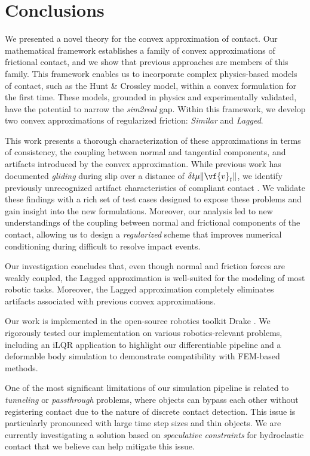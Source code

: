 \section{Conclusions}
\label{sec:conclusions}

We presented a novel theory for the convex approximation of contact. Our
mathematical framework establishes a family of convex approximations of
frictional contact, and we show that previous approaches
\cite{bib:anitescu2006,bib:todorov2011,bib:castro2022unconstrained} are members of
this family. This framework enables us to incorporate complex physics-based
models of contact, such as the Hunt \& Crossley \cite{bib:hunt_crossley} model,
within a convex formulation for the first time. These models, grounded
in physics and experimentally validated, have the potential to narrow the
\emph{sim2real} gap. Within this framework, we develop two convex approximations
of regularized friction: \emph{Similar} and \emph{Lagged}.

This work presents a thorough characterization of these approximations in
terms of consistency, the coupling between normal and tangential components, and
artifacts introduced by the convex approximation. While previous work has documented
\emph{gliding} during slip over a distance of $\delta t\mu\Vert\vf{v}_t\Vert$, we
identify previously unrecognized artifact characteristics of compliant contact
\cite{bib:todorov2011,bib:castro2022unconstrained}.
We validate these findings with a rich set of test cases designed to expose these
problems and gain insight into the new formulations. Moreover, our analysis
led to new understandings of the coupling between normal and frictional
components of the contact, allowing us to design a \emph{regularized} scheme that improves
numerical conditioning during difficult to resolve impact events. 

Our investigation concludes that, even though normal and friction forces are
weakly coupled, the Lagged approximation is well-suited for the modeling of most
robotic tasks. Moreover, the Lagged approximation completely eliminates
artifacts associated with previous convex approximations.

Our work is implemented in the open-source robotics toolkit Drake \cite{bib:drake}. 
We rigorously tested our implementation on various robotics-relevant problems, including
an iLQR application to highlight our differentiable pipeline and a deformable body
simulation to demonstrate compatibility with FEM-based methods.

One of the most significant limitations of our simulation pipeline is
related to \emph{tunneling} or \emph{passthrough} problems, where objects can
bypass each other without registering contact due to the nature of discrete contact detection.
This issue is particularly pronounced
with large time step sizes and thin objects. We are currently investigating a solution
based on \emph{speculative constraints} \cite{bib:catto} for hydroelastic contact
\cite{bib:elandt2019pressure,bib:masterjohn2021discrete} that we believe can
help mitigate this issue.
